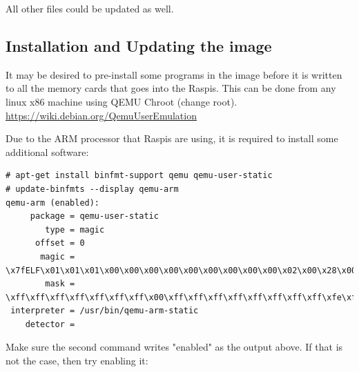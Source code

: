 %

All other files could be updated as well.

\subsection{Installation and Updating the image}

It may be desired to pre-install some programs in the image before it is
written to all the memory cards that goes into the \ac{Raspi}s.
This can be done from any linux x86 machine using QEMU Chroot (change root).
\url{https://wiki.debian.org/QemuUserEmulation}

Due to the \ac{ARM} processor that \ac{Raspi}s are using, it is required to
install some additional software:

\begin{lstlisting}[]
# apt-get install binfmt-support qemu qemu-user-static
# update-binfmts --display qemu-arm
qemu-arm (enabled):
     package = qemu-user-static
        type = magic
      offset = 0
       magic = \x7fELF\x01\x01\x01\x00\x00\x00\x00\x00\x00\x00\x00\x00\x02\x00\x28\x00
        mask = \xff\xff\xff\xff\xff\xff\xff\x00\xff\xff\xff\xff\xff\xff\xff\xff\xfe\xff\xff\xff
 interpreter = /usr/bin/qemu-arm-static
    detector = 
\end{lstlisting}
\FloatBarrier
\vspace{-5mm}

Make sure the second command writes "enabled" as the output above. If that 
is not the case, then try enabling it:

